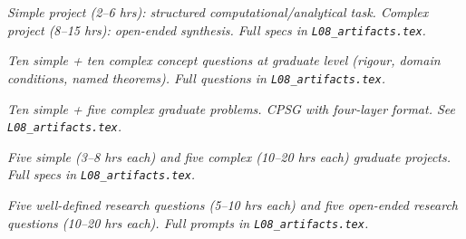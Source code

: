 \begin{tcolorbox}[ugprobbox, title={SPJU + CPJU · L08 · Tiers 2–3}]
\textit{Simple project (2–6 hrs): structured computational/analytical task.
Complex project (8–15 hrs): open-ended synthesis.
Full specs in \texttt{L08_artifacts.tex}.}
\end{tcolorbox}

\begin{tcolorbox}[gradconceptbox, title={SCQG + CCQG · L08 · Tiers 4–5}]
\textit{Ten simple + ten complex concept questions at graduate level (rigour, domain
conditions, named theorems). Full questions in \texttt{L08_artifacts.tex}.}
\end{tcolorbox}

\begin{tcolorbox}[gradprobbox, title={SPSG + CPSG · L08 · Tiers 4–5}]
\textit{Ten simple + five complex graduate problems.
CPSG with four-layer format. See \texttt{L08_artifacts.tex}.}
\end{tcolorbox}

\begin{tcolorbox}[gradprobbox, title={SPJG (×5) + CPJG (×5) · L08 · Tiers 4–5}]
\textit{Five simple (3–8 hrs each) and five complex (10–20 hrs each) graduate projects.
Full specs in \texttt{L08_artifacts.tex}.}
\end{tcolorbox}

\begin{tcolorbox}[researchbox, title={WRQ (×5) + ORQ (×5) · L08 · Tiers 4–5}]
\textit{Five well-defined research questions (5–10 hrs each) and five open-ended
research questions (10–20 hrs each). Full prompts in \texttt{L08_artifacts.tex}.}
\end{tcolorbox}
